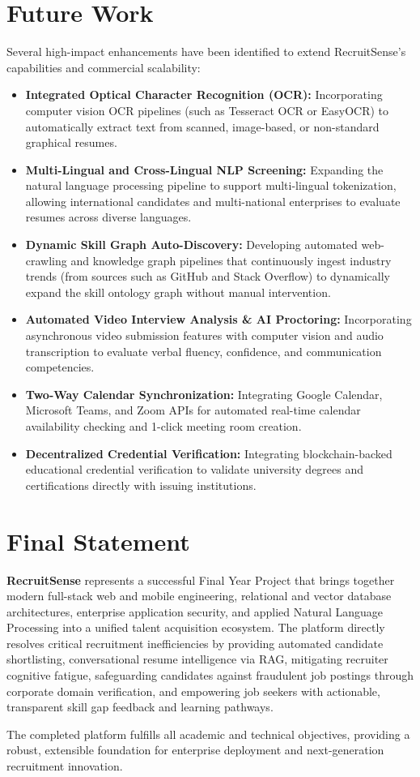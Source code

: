 \section{Future Work}
Several high-impact enhancements have been identified to extend RecruitSense's capabilities and commercial scalability:
\begin{itemize}
    \item \textbf{Integrated Optical Character Recognition (OCR):} Incorporating computer vision OCR pipelines (such as Tesseract OCR or EasyOCR) to automatically extract text from scanned, image-based, or non-standard graphical resumes.
    \item \textbf{Multi-Lingual and Cross-Lingual NLP Screening:} Expanding the natural language processing pipeline to support multi-lingual tokenization, allowing international candidates and multi-national enterprises to evaluate resumes across diverse languages.
    \item \textbf{Dynamic Skill Graph Auto-Discovery:} Developing automated web-crawling and knowledge graph pipelines that continuously ingest industry trends (from sources such as GitHub and Stack Overflow) to dynamically expand the skill ontology graph without manual intervention.
    \item \textbf{Automated Video Interview Analysis & AI Proctoring:} Incorporating asynchronous video submission features with computer vision and audio transcription to evaluate verbal fluency, confidence, and communication competencies.
    \item \textbf{Two-Way Calendar Synchronization:} Integrating Google Calendar, Microsoft Teams, and Zoom APIs for automated real-time calendar availability checking and 1-click meeting room creation.
    \item \textbf{Decentralized Credential Verification:} Integrating blockchain-backed educational credential verification to validate university degrees and certifications directly with issuing institutions.
\end{itemize}

\section{Final Statement}
\textbf{RecruitSense} represents a successful Final Year Project that brings together modern full-stack web and mobile engineering, relational and vector database architectures, enterprise application security, and applied Natural Language Processing into a unified talent acquisition ecosystem. The platform directly resolves critical recruitment inefficiencies by providing automated candidate shortlisting, conversational resume intelligence via RAG, mitigating recruiter cognitive fatigue, safeguarding candidates against fraudulent job postings through corporate domain verification, and empowering job seekers with actionable, transparent skill gap feedback and learning pathways.

The completed platform fulfills all academic and technical objectives, providing a robust, extensible foundation for enterprise deployment and next-generation recruitment innovation.
